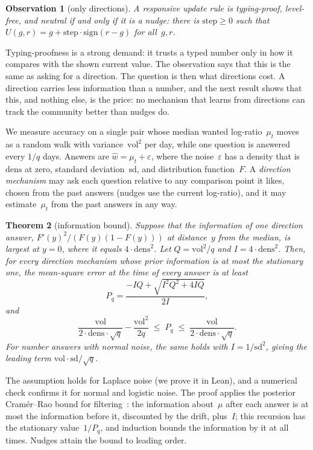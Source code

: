 \documentclass[doubleblind]{ecai}
\newtheorem{theorem}{Theorem}
\newtheorem{observation}[theorem]{Observation}
\theoremstyle{remark}
\newcommand{\step}{\mathrm{step}}
\newcommand{\vol}{\mathrm{vol}}
\newcommand{\dens}{\mathrm{dens}}
\newcommand{\sd}{\mathrm{sd}}
\newcommand{\sign}{\mathrm{sign}}
\begin{document}
\begin{observation}[only directions]\label{obs:char}
A responsive update rule is typing-proof, level-free, and neutral if and only if it is a nudge: there is $\step \ge 0$ such that $U(g,r) = g + \step\cdot\sign(r-g)$ for all~$g,r$.
\end{observation}

Typing-proofness is a strong demand: it trusts a typed number only in how it compares with the shown current value. The observation says that this is the same as asking for a direction. The question is then what directions cost. A direction carries less information than a number, and the next result shows that this, and nothing else, is the price: no mechanism that learns from directions can track the community better than nudges do.

We measure accuracy on a single pair whose median wanted log-ratio~$\mu_t$ moves as a random walk with variance~$\vol^2$ per day, while one question is answered every $1/q$ days. Answers are $\hat w = \mu_t + \varepsilon$, where the noise~$\varepsilon$ has a density that is~$\dens$ at zero, standard deviation~$\sd$, and distribution function~$F$. A \emph{direction mechanism} may ask each question relative to any comparison point it likes, chosen from the past answers (nudges use the current log-ratio), and it may estimate~$\mu_t$ from the past answers in any way.

\begin{theorem}[information bound]\label{thm:bound}
Suppose that the information of one direction answer, $F'(y)^2/(F(y)(1-F(y)))$ at distance~$y$ from the median, is largest at $y=0$, where it equals $4\cdot\dens^2$. Let $Q = \vol^2/q$ and $I = 4\cdot\dens^2$. Then, for every direction mechanism whose prior information is at most the stationary one, the mean-square error at the time of every answer is at least
\[
P_q = \frac{-IQ + \sqrt{I^2Q^2 + 4IQ}}{2I},
\]
and
\[
\frac{\vol}{2\cdot\dens\cdot\sqrt q} - \frac{\vol^2}{2q} \;\le\; P_q \;\le\; \frac{\vol}{2\cdot\dens\cdot\sqrt q}.
\]
For number answers with normal noise, the same holds with $I = 1/\sd^2$, giving the leading term $\vol\cdot\sd/\sqrt q$.
\end{theorem}

The assumption holds for Laplace noise (we prove it in Lean), and a numerical check confirms it for normal and logistic noise. The proof applies the posterior Cram\'er--Rao bound for filtering~\cite{tichavsky1998pcrb}: the information about~$\mu$ after each answer is at most the information before it, discounted by the drift, plus~$I$; this recursion has the stationary value~$1/P_q$, and induction bounds the information by it at all times. Nudges attain the bound to leading order.
\end{document}
